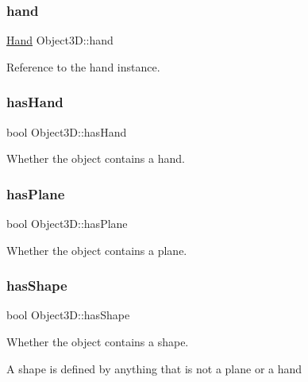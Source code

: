 \subsubsection{\texorpdfstring{hand}{hand}}
{\footnotesize\ttfamily \hyperlink{class_hand}{Hand} Object3\+D\+::hand\hspace{0.3cm}{\ttfamily [private]}}



Reference to the hand instance. 

\hypertarget{class_object3_d_a8cfee001a38488c0eeaa0a1333c1ba48}{}\label{class_object3_d_a8cfee001a38488c0eeaa0a1333c1ba48} 
\subsubsection{\texorpdfstring{has\+Hand}{hasHand}}
{\footnotesize\ttfamily bool Object3\+D\+::has\+Hand}



Whether the object contains a hand. 

\hypertarget{class_object3_d_a6a53bea872dadddc06e64ee6b7d7b238}{}\label{class_object3_d_a6a53bea872dadddc06e64ee6b7d7b238} 
\subsubsection{\texorpdfstring{has\+Plane}{hasPlane}}
{\footnotesize\ttfamily bool Object3\+D\+::has\+Plane}



Whether the object contains a plane. 

\hypertarget{class_object3_d_a00110e4274ca6e0f107e78e2e097d6d0}{}\label{class_object3_d_a00110e4274ca6e0f107e78e2e097d6d0} 
\subsubsection{\texorpdfstring{has\+Shape}{hasShape}}
{\footnotesize\ttfamily bool Object3\+D\+::has\+Shape}



Whether the object contains a shape. 

A shape is defined by anything that is not a plane or a hand \hypertarget{class_object3_d_ac12ac80ceca7b3d6aa3d935956e6e04b}{}\label{class_object3_d_ac12ac80ceca7b3d6aa3d935956e6e04b} 
